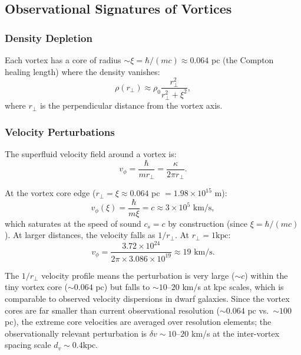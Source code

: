 \documentclass[11pt,a4paper]{article}
\newcommand{\kpc}{\ensuremath{\mathrm{kpc}}}
\theoremstyle{definition}
\theoremstyle{remark}
\begin{document}
\subsection{Observational Signatures of Vortices}
\label{sec:vortex_signatures}

\subsubsection{Density Depletion}

Each vortex has a core of radius $\sim \xi = \hbar/(mc) \approx 0.064$ pc (the Compton healing length) where the density vanishes:
\begin{equation}
\rho(r_\perp) \approx \rho_0 \frac{r_\perp^2}{r_\perp^2 + \xi^2},
\end{equation}
where $r_\perp$ is the perpendicular distance from the vortex axis.

\subsubsection{Velocity Perturbations}

The superfluid velocity field around a vortex is:
\begin{equation}
v_\phi = \frac{\hbar}{mr_\perp} = \frac{\kappa}{2\pi r_\perp}.
\end{equation}

At the vortex core edge ($r_\perp = \xi \approx 0.064$ pc $= 1.98 \times 10^{15}$ m):
\begin{equation}
v_\phi(\xi) = \frac{\hbar}{m\xi} = c \approx 3 \times 10^5 \text{ km/s},
\end{equation}
which saturates at the speed of sound $c_s = c$ by construction (since $\xi = \hbar/(mc)$).  At larger distances, the velocity falls as $1/r_\perp$.  At $r_\perp = 1 \kpc$:
\begin{equation}
v_\phi = \frac{3.72 \times 10^{24}}{2\pi \times 3.086 \times 10^{19}} \approx 19 \text{ km/s}.
\end{equation}

The $1/r_\perp$ velocity profile means the perturbation is very large ($\sim c$) within the tiny vortex core ($\sim 0.064$ pc) but falls to $\sim 10$--$20$ km/s at kpc scales, which is comparable to observed velocity dispersions in dwarf galaxies.  Since the vortex cores are far smaller than current observational resolution ($\sim 0.064$ pc vs.\ $\sim 100$ pc), the extreme core velocities are averaged over resolution elements; the observationally relevant perturbation is $\delta v \sim 10$--$20$ km/s at the inter-vortex spacing scale $d_v \sim 0.4 \kpc$.
\end{document}

